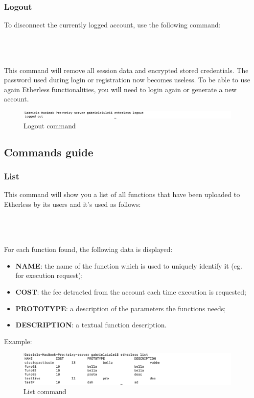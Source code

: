 \subsubsection{Logout}
To disconnect the currently logged account, use the following command:\\\\
\centerline{}\\\\
This command will remove all session data and encrypted stored credentials. The password used during login or registration now becomes useless. To be able to use again Etherless functionalities, you will need to login again or generate a new account.\\
\begin{figure}[h]
	\centering
	\includegraphics[width=\textwidth]{res/img/logout.png}
	\caption{Logout command}
\end{figure}
\newpage
\subsection{Commands guide}
\subsubsection{List}
This command will show you a list of all functions that have been uploaded to Etherless by its users and it's used as follows:\\\\
\centerline {}\\\\
For each function found, the following data is displayed:
\begin{itemize}
	\item \textbf{NAME}: the name of the function which is used to uniquely identify it (eg. for execution request);
	\item \textbf{COST}: the fee detracted from the account each time execution is requested;
	\item \textbf{PROTOTYPE}: a description of the parameters the functions needs;
	\item \textbf{DESCRIPTION}: a textual function description.
\end{itemize}
Example:
\begin{figure}[h]
	\begin{center}
	\includegraphics[width=\textwidth]{res/img/list.png}
	\caption{List command}
	\end{center}
\end{figure}
